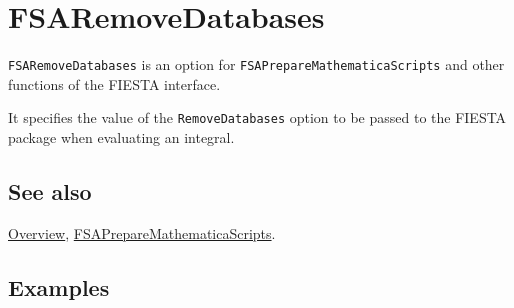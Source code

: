 \documentclass[../FeynHelpersManual.tex]{subfiles}
\begin{document}
\hypertarget{fsaremovedatabases}{
\section{FSARemoveDatabases}\label{fsaremovedatabases}}

\texttt{FSARemoveDatabases} is an option for
\texttt{FSAPrepareMathematicaScripts} and other functions of the FIESTA
interface.

It specifies the value of the \texttt{RemoveDatabases} option to be
passed to the FIESTA package when evaluating an integral.

\subsection{See also}

\hyperlink{toc}{Overview},
\hyperlink{fsapreparemathematicascripts}{FSAPrepareMathematicaScripts}.

\subsection{Examples}
\end{document}
